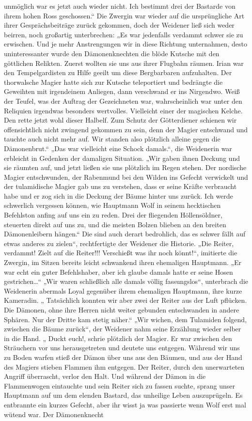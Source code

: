unmöglich war es jetzt auch wieder nicht. Ich bestimmt drei der Bastarde von ihrem hohen Ross geschossen.“ Die Zwergin war wieder auf die ursprüngliche Art ihrer Gesprächsbeiträge zurück gekommen, doch der Weidener ließ sich weder beirren, noch großartig unterbrechen: „Es war jedenfalls verdammt schwer sie zu erwischen. Und je mehr Anstrengungen wir in diese Richtung unternahmen, desto uninteressanter wurde den Dämonenknechten die blöde Kutsche mit den göttlichen Relikten. Zuerst wollten sie uns aus ihrer Flugbahn räumen. Irian war den Tempelgardisten zu Hilfe geeilt um diese Bergbarbaren aufzuhalten. Der thorwalsche Magier hatte sich zur Kutsche teleportiert und bedrängte die Geweihten mit irgendeinem Anliegen, dann verschwand er ins Nirgendwo. Weiß der Teufel, was der Auftrag der Gezeichneten war, wahrscheinlich war unter den Reliquien irgendwas besonders wertvolles. Vielleicht einer der magischen Kelche. Den rette jetzt wohl dieser Halbelf. Zum Schutz der Götterdiener schienen wir offensichtlich nicht zwingend gekommen zu sein, denn der Magier entschwand und tauchte auch nicht mehr auf. Wir standen also plötzlich alleine gegen die Dämonenbrut.“ „Das war vielleicht eine Schock damals.“, die Weidenerin war erbleicht in Gedenken der damaligen Situation. „Wir gaben ihnen Deckung und sie räumten auf, und jetzt ließen sie uns plötzlich im Regen stehen. Der nordische Magier entschwunden, der Rabenmund bei den Wilden ins Gefecht verwickelt und der tulamidische Magier gab uns zu verstehen, dass er seine Kräfte verbraucht habe und er zog sich in die Deckung der Bäume hinter uns zurück. Ich werde schwerlich vergessen können, wie Hauptmann Wolf in seinem hecktischen Befehlston anfing auf uns ein zu reden. Drei der fliegenden Höllensöldner, steuerten direkt auf uns zu, und die meisten Bolzen blieben an den breiten Dämonenleibern hängen.“ Die sind auch derart bedrohlich, das es schwer fällt auf etwas anderes zu zielen“, rechtfertigte der Weidener die Historie. „Die Reiter, verdammt! Zielt auf die Reiter!!! Verschießt was ihr noch könnt!“, imitierte die Zwergin, im Sitzen bereits leicht schwankend ihren ehemaligen Hauptmann. „Er war echt ein guter Befehlshaber, aber ich glaube damals hatte er seine Hosen gestrichen…“ „Wir waren schließlich alle damals völlig fassungslos“, unterbrach die Weidenerin abermals Loyal gegenüber ihrem ehemaligen Hauptmann, ihre kurze Kameradin. „ Tatsächlich konnten wir aber zwei der Reiter aus der Luft pflücken. Die Dämonen, ohne ihre Herren nicht weiter gebunden entschwanden in andere Sphären. Nur der Dritte kam stetig näher.“ „Wir wichen, dem Tulamiden folgend, zwischen die Bäume zurück“, der Weidener nahm seine Erzählung wieder selber in die Hand. „ Duckt euch!, schrie plötzlich der Magier. Er war zwischen den Sträuchern vor uns herausgetreten und deutete uns entgegen. Während wir uns zu Boden warfen stieß der Dämon über uns aus den Bäumen, und aus der Hand des Magiers stieben Flammen ihm entgegen. Der Reiter, durch den unerwarteten Angriff überrascht, verlor den Halt. Und während der Dämon in die Flammenwogen eintauchte und sein Reiter sich zu fassen suchte, sprang unser Hauptmann auf um dem elenden Bastard, das unheilige Leben auszuprügeln. Es entbrannte ein kurzes Gefecht, aber ihr wisst ja was passierte wenn Wolf erst mal wütend war. Der Dämonenknecht 